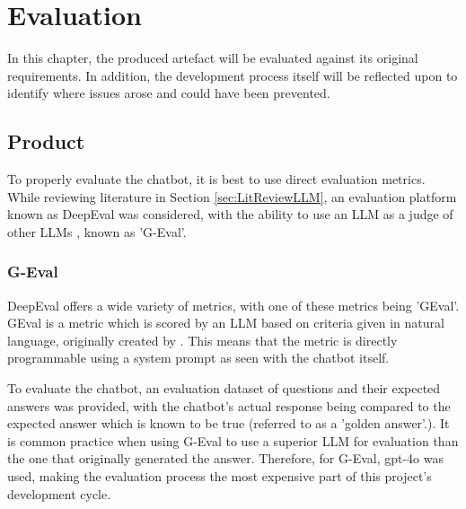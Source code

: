 \chapter{Evaluation}\label{ch:Evaluation}
In this chapter, the produced artefact will be evaluated against its original requirements.
In addition, the development process itself will be reflected upon to identify where issues arose 
and could have been prevented.

\section{Product}


\para To properly evaluate the chatbot, it is best to use direct evaluation metrics. While reviewing literature in Section 
\ref{sec:LitReviewLLM}, an evaluation platform known as DeepEval was considered, with the ability to use an LLM as a judge of 
other LLMs \autocite{deepeval_introduction_2024}, known as 'G-Eval'.

\subsection{G-Eval}\label{sec:DeepEval}
DeepEval offers a wide variety of metrics, with one of these metrics being 'GEval'. GEval is a metric which is scored by an LLM based 
on criteria given in natural language, originally created by \textcite{liuGEvalNLGEvaluation2023a}. This means that the metric is directly 
programmable using a system prompt as seen with the chatbot itself.

\para 
To evaluate the chatbot, an evaluation dataset of questions and their expected answers was provided, with the chatbot's actual response being
compared to the expected answer which is known to be true (referred to as a 'golden answer'.). It is common practice when using G-Eval to use a 
superior LLM for evaluation than the one that originally generated the answer. Therefore, for G-Eval, gpt-4o was used, making the evaluation process 
the most expensive part of this project's development cycle. 

